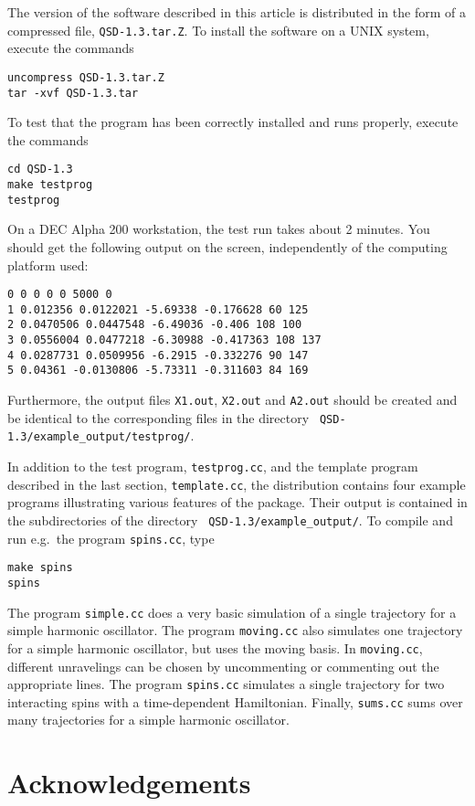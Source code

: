 The version of the software described in this article is distributed
in the form of a compressed file, {\tt QSD-1.3.tar.Z}. To install 
the software on a UNIX system, execute the commands
\begin{verbatim}
uncompress QSD-1.3.tar.Z
tar -xvf QSD-1.3.tar
\end{verbatim}
To test that the program has been correctly installed and runs properly, 
execute the commands
\begin{verbatim}
cd QSD-1.3
make testprog
testprog
\end{verbatim}
On a DEC Alpha 200 workstation, the test run takes about 2 minutes.
You should get the following output on the screen, independently of the
computing platform used:
\begin{verbatim}
0 0 0 0 0 5000 0
1 0.012356 0.0122021 -5.69338 -0.176628 60 125
2 0.0470506 0.0447548 -6.49036 -0.406 108 100
3 0.0556004 0.0477218 -6.30988 -0.417363 108 137
4 0.0287731 0.0509956 -6.2915 -0.332276 90 147
5 0.04361 -0.0130806 -5.73311 -0.311603 84 169
\end{verbatim}
Furthermore, the output files {\tt X1.out}, {\tt X2.out} and {\tt A2.out} 
should be
created and be identical to the corresponding files in the directory {\tt
QSD-1.3/example\_output/testprog/}.

In addition to the test program, {\tt testprog.cc}, and the template program
described in the last section, {\tt template.cc}, the distribution contains
four example programs illustrating various features of the package. Their
output is contained in the subdirectories of the directory {\tt
QSD-1.3/example\_output/}.   To compile and run e.g.\ the program
{\tt spins.cc}, type
\begin{verbatim}
make spins
spins
\end{verbatim}
The program {\tt simple.cc} does a very basic
simulation of a single trajectory for a simple harmonic oscillator. The program
{\tt moving.cc} also simulates one trajectory for a simple harmonic oscillator,
but uses the moving basis. In {\tt moving.cc}, different unravelings can be
chosen by uncommenting or commenting out the appropriate lines. The program
{\tt spins.cc} simulates a single trajectory for two interacting spins with a
time-dependent Hamiltonian. Finally, {\tt sums.cc} sums over many trajectories
for a simple harmonic oscillator.


\section*{Acknowledgements}

